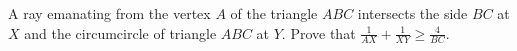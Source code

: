 A ray emanating from the vertex $A$ of the triangle $ABC$ intersects the side $BC$ at $X$ and the circumcircle of triangle $ABC$ at $Y$. Prove that $\frac{1}{AX}+\frac{1}{XY}\geq \frac{4}{BC}$.